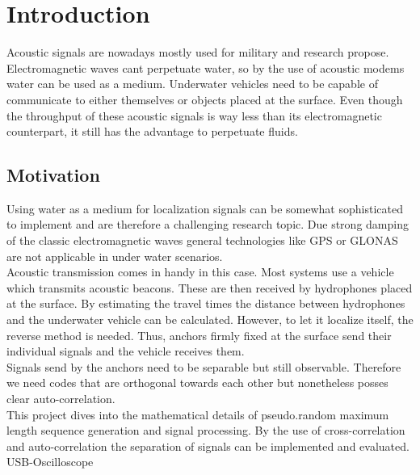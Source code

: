 \chapter{Introduction}

Acoustic signals are nowadays mostly used for military and research propose. Electromagnetic waves cant perpetuate water, so by the use of acoustic modems water can be used as a medium. Underwater vehicles need to be capable of communicate to either themselves or objects placed at the surface. Even though the throughput of these acoustic signals is way less than its electromagnetic counterpart, it still has the advantage to perpetuate fluids.\\


\section{Motivation}

Using water as a medium for localization signals can be somewhat sophisticated to implement and are therefore a challenging research topic. Due strong damping of the classic electromagnetic waves general technologies like GPS or GLONAS are not applicable in under water scenarios. \\
Acoustic transmission comes in handy in this case. Most systems use a vehicle which transmits acoustic beacons. These are then received by hydrophones placed at the surface. By estimating the travel times the distance between hydrophones and the underwater vehicle can be calculated. However, to let it localize itself, the reverse method is needed. Thus, anchors firmly fixed at the surface send their individual signals and the vehicle receives them.\\
Signals send by the anchors need to be separable but still observable. Therefore we need codes that are orthogonal towards each other but nonetheless posses clear auto-correlation. \\
This project dives into the mathematical details of pseudo.random maximum length sequence generation and signal processing. By the use of cross-correlation and auto-correlation the separation of signals can be implemented and evaluated. 
 USB-Oscilloscope
